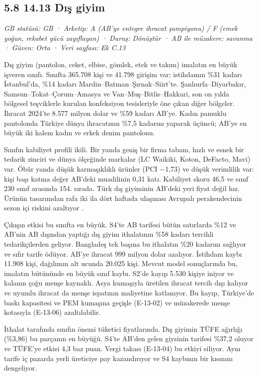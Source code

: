 \hypertarget{nace_kartlar_13-15-58-1413-dux131ux15f-giyim}{%
\subsection{5.8 14.13 Dış giyim}\label{nace_kartlar_13-15-58-1413-dux131ux15f-giyim}}

\emph{GB statüsü: GB · Arketip: A (AB'ye entegre ihracat şampiyonu) / F (emek yoğun, rekabet gücü zayıflayan) · Duruş: Dönüştür · AB ile müzakere: savunma · Güven: Orta · Veri sayfası: Ek C.13}

Dış giyim (pantolon, ceket, elbise, gömlek, etek ve takım) imalatın en büyük işveren sınıfı. Sınıfta 365.708 kişi ve 41.798 girişim var; istihdamın \%31 kadarı İstanbul'da, \%14 kadarı Mardin--Batman--Şırnak--Siirt'te. Şanlıurfa--Diyarbakır, Samsun--Tokat--Çorum--Amasya ve Van--Muş--Bitlis--Hakkari, son on yılda bölgesel teşviklerle kurulan konfeksiyon tesisleriyle öne çıkan diğer bölgeler. İhracat 2024'te 8.577 milyon dolar ve \%59 kadarı AB'ye. Kadın pamuklu pantolonda Türkiye dünya ihracatının \%7,5 kadarını yaparak üçüncü; AB'ye en büyük iki kalem kadın ve erkek denim pantolonu.

Sınıfın kabiliyet profili ikili. Bir yanda geniş bir firma tabanı, hızlı ve esnek bir tedarik zinciri ve dünya ölçeğinde markalar (LC Waikiki, Koton, DeFacto, Mavi) var. Öbür yanda düşük karmaşıklıklı ürünler (PCI −1,73) ve düşük verimlilik var: kişi başı katma değer AB'deki muadilinin 0,31 katı. Kabiliyet skoru 46,5 ve sınıf 230 sınıf arasında 154. sırada. Türk dış giyiminin AB'deki yeri fiyat değil hız. Ürünün tasarımdan rafa iki ila dört haftada ulaşması Avrupalı perakendecinin sezon içi riskini azaltıyor \etiketH{}.

Çıkışın etkisi bu sınıfta en büyük. S4'te AB tarifesi bütün satırlarda \%12 ve AB'nin AB dışından yaptığı dış giyim ithalatının \%58 kadarı tercihli tedarikçilerden geliyor. Bangladeş tek başına bu ithalatın \%20 kadarını sağlıyor ve sıfır tarife ödüyor. AB'ye ihracat 999 milyon dolar azalıyor. İstihdam kaybı 11.908 kişi, dağılımın alt ucunda 20.025 kişi. Mevcut model sonuçlarında bu, imalatın bütününde en büyük sınıf kaybı. S2'de kayıp 5.530 kişiye iniyor ve kalanın çoğu menşe kaynaklı. Asya kumaşıyla üretilen ihracat tercih dışı kalıyor ve uyumlu ihracat da menşe ispatının maliyetine katlanıyor. Bu kayıp, Türkiye'de baskı kapasitesi ve PEM kumaşına geçişle (E-13-02) ve müzakerede menşe kotasıyla (E-13-06) azaltılabilir.

İthalat tarafında sınıfın önemi tüketici fiyatlarında. Dış giyimin TÜFE ağırlığı (\%3,86) bu parçanın en büyüğü. S4'te AB'den gelen giysinin tarifesi \%37,2 oluyor ve TÜFE'ye etkisi 4,3 baz puan. Vergi takası (E-13-04) bu etkiyi siliyor. Aynı tarife iç pazarda yerli üreticiye pay kazandırıyor ve S4 kaybının bir kısmını dengeliyor.

